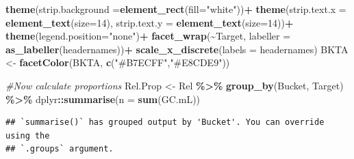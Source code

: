 \documentclass[
]{article}
\newenvironment{Shaded}{\begin{snugshade}}{\end{snugshade}}
\newcommand{\AttributeTok}[1]{\textcolor[rgb]{0.13,0.29,0.53}{#1}}
\newcommand{\CommentTok}[1]{\textcolor[rgb]{0.56,0.35,0.01}{\textit{#1}}}
\newcommand{\DecValTok}[1]{\textcolor[rgb]{0.00,0.00,0.81}{#1}}
\newcommand{\FunctionTok}[1]{\textcolor[rgb]{0.13,0.29,0.53}{\textbf{#1}}}
\newcommand{\NormalTok}[1]{#1}
\newcommand{\OtherTok}[1]{\textcolor[rgb]{0.56,0.35,0.01}{#1}}
\newcommand{\SpecialCharTok}[1]{\textcolor[rgb]{0.81,0.36,0.00}{\textbf{#1}}}
\newcommand{\StringTok}[1]{\textcolor[rgb]{0.31,0.60,0.02}{#1}}
\begin{document}
\begin{Shaded}
\begin{Highlighting}[]
  \FunctionTok{theme}\NormalTok{(}\AttributeTok{strip.background =}\FunctionTok{element\_rect}\NormalTok{(}\AttributeTok{fill=}\StringTok{"white"}\NormalTok{))}\SpecialCharTok{+}
  \FunctionTok{theme}\NormalTok{(}\AttributeTok{strip.text.x =} \FunctionTok{element\_text}\NormalTok{(}\AttributeTok{size=}\DecValTok{14}\NormalTok{),}
        \AttributeTok{strip.text.y =} \FunctionTok{element\_text}\NormalTok{(}\AttributeTok{size=}\DecValTok{14}\NormalTok{))}\SpecialCharTok{+}
  \FunctionTok{theme}\NormalTok{(}\AttributeTok{legend.position=}\StringTok{"none"}\NormalTok{)}\SpecialCharTok{+}
  \FunctionTok{facet\_wrap}\NormalTok{(}\SpecialCharTok{\textasciitilde{}}\NormalTok{Target, }\AttributeTok{labeller =} \FunctionTok{as\_labeller}\NormalTok{(headernames))}\SpecialCharTok{+}
  \FunctionTok{scale\_x\_discrete}\NormalTok{(}\AttributeTok{labels =}\NormalTok{ headernames)}
\NormalTok{BKTA }\OtherTok{\textless{}{-}} \FunctionTok{facetColor}\NormalTok{(BKTA, }\FunctionTok{c}\NormalTok{(}\StringTok{"\#B7ECFF"}\NormalTok{,}\StringTok{"\#E8CDE9"}\NormalTok{))}

\CommentTok{\#Now calculate proportions}
\NormalTok{Rel.Prop }\OtherTok{\textless{}{-}}\NormalTok{ Rel }\SpecialCharTok{\%\textgreater{}\%} 
  \FunctionTok{group\_by}\NormalTok{(Bucket, Target) }\SpecialCharTok{\%\textgreater{}\%} 
\NormalTok{  dplyr}\SpecialCharTok{::}\FunctionTok{summarise}\NormalTok{(}\AttributeTok{n =} \FunctionTok{sum}\NormalTok{(GC.mL)) }
\end{Highlighting}
\end{Shaded}

\begin{verbatim}
## `summarise()` has grouped output by 'Bucket'. You can override using the
## `.groups` argument.
\end{verbatim}
\end{document}
